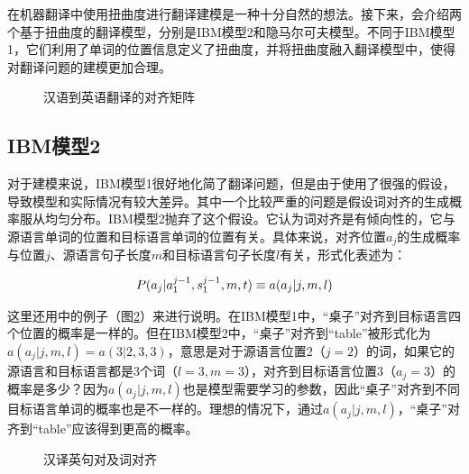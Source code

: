 \parinterval 在机器翻译中使用扭曲度进行翻译建模是一种十分自然的想法。接下来，会介绍两个基于扭曲度的翻译模型，分别是IBM模型2和隐马尔可夫模型。不同于IBM模型1，它们利用了单词的位置信息定义了扭曲度，并将扭曲度融入翻译模型中，使得对翻译问题的建模更加合理。

\begin{figure}[htp]
    \centering

    \caption{汉语到英语翻译的对齐矩阵}
    \label{fig:6-2}
\end{figure}

\subsection{IBM模型2}

\parinterval 对于建模来说，IBM模型1很好地化简了翻译问题，但是由于使用了很强的假设，导致模型和实际情况有较大差异。其中一个比较严重的问题是假设词对齐的生成概率服从均匀分布。IBM模型2抛弃了这个假设。它认为词对齐是有倾向性的，它与源语言单词的位置和目标语言单词的位置有关。具体来说，对齐位置$a_j$的生成概率与位置$j$、源语言句子长度$m$和目标语言句子长度$l$有关，形式化表述为：

\begin{eqnarray}
{P}(a_j|a_1^{j-1},s_1^{j-1},m,{t}) \equiv a(a_j|j,m,l)
\label{eq:6-1}
\end{eqnarray}

\parinterval 这里还用{\chapterthree}中的例子（图\ref{fig:6-3}）来进行说明。在IBM模型1中，“桌子”对齐到目标语言四个位置的概率是一样的。但在IBM模型2中，“桌子”对齐到“table”被形式化为$a(a_j |j,m,l)=a(3|2,3,3)$，意思是对于源语言位置2（$j=2$）的词，如果它的源语言和目标语言都是3个词（$l=3,m=3$），对齐到目标语言位置3（$a_j=3$）的概率是多少？因为$a(a_j|j,m,l)$也是模型需要学习的参数，因此“桌子”对齐到不同目标语言单词的概率也是不一样的。理想的情况下，通过$a(a_j|j,m,l)$，“桌子”对齐到“table”应该得到更高的概率。

\begin{figure}[htp]
    \centering

    \caption{汉译英句对及词对齐}
    \label{fig:6-3}
\end{figure}


